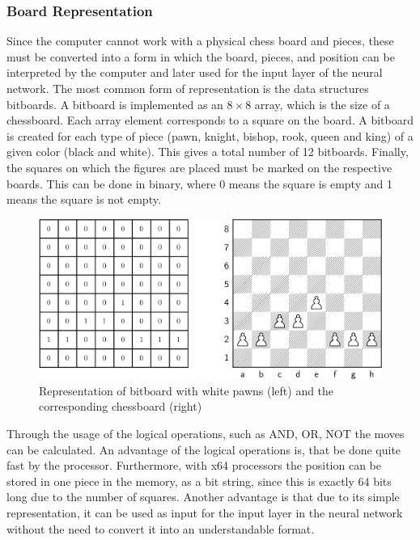 \subsubsection{Board Representation}

Since the computer cannot work with a physical chess board and pieces, these must be converted into a form in which the board, pieces, and position can be interpreted by the computer and later used for the input layer of the neural network. The most common form of representation is the data structures bitboards. A bitboard is implemented as an $8 \times 8$ array, which is the size of a chessboard. Each array element corresponds to a square on the board. A bitboard is created for each type of piece (pawn, knight, bishop, rook, queen and king) of a given color (black and white). This gives a total number of 12 bitboards. Finally, the squares on which the figures are placed must be marked on the respective boards. This can be done in binary, where 0 means the square is empty and 1 means the square is not empty.

\begin{figure}[h]
\centering
\includegraphics[scale=0.13]{graphics/bitboard/bitboard_and_chessboard.png}
\caption{Representation of bitboard with white pawns (left) and the corresponding chessboard (right)}
\end{figure}

Through the usage of the logical operations, such as AND, OR, NOT the moves can be calculated. An advantage of the logical operations is, that be done quite fast by the processor. Furthermore, with x64 processors the position can be stored in one piece in the memory, as a bit string, since this is exactly 64 bits long due to the number of squares. Another advantage is that due to its simple representation, it can be used as input for the input layer in the neural network without the need to convert it into an understandable format.